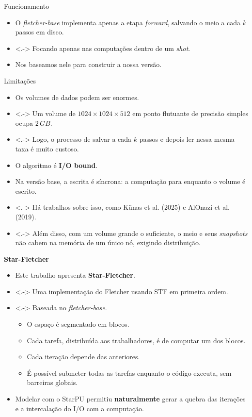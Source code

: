 \documentclass{beamer}
\newcommand{\starflet}{\textbf{Star-Fletcher}}
\begin{document}
\begin{frame}{Funcionamento}
  \begin{itemize}
  \item<+-> O \textit{fletcher-base} implementa apenas a etapa \textit{forward}, salvando o meio a cada $k$ passos em disco.
  \item<.-> Focando apenas nas computações dentro de um \textit{shot}.
  \item<+-> Nos baseamos nele para construir a nossa versão.
  \end{itemize}
\end{frame}

\begin{frame}{Limitações}
  \begin{itemize}
  \item<+-> Os volumes de dados podem ser enormes.
  \item<.-> Um volume de $1024 \times 1024 \times 512$ em ponto flutuante de precisão simples ocupa $2\,GB$.
  \item<.-> Logo, o processo de salvar a cada $k$ passos e depois ler nessa mesma taxa é muito custoso.
  \item<+-> O algoritmo é \textbf{I/O bound}.
  \item<+-> Na versão base, a escrita é síncrona: a computação para enquanto o volume é escrito.
  \item<.-> Há trabalhos sobre isso, como Künas et al. (2025) e AlOnazi et al. (2019).
  \item<.-> Além disso, com um volume grande o suficiente, o meio e seus \textit{snapshots} não cabem na memória de um único nó, exigindo distribuição.
  \end{itemize}
\end{frame}


\begin{frame}{\starflet}
  \begin{itemize}
  \item<+-> Este trabalho apresenta \starflet.
  \item<.-> Uma implementação do Fletcher usando STF em primeira ordem.
  \item<.-> Baseada no \textit{fletcher-base}.
    \begin{itemize}
    \item<+-> O espaço é segmentado em blocos.
    \item<+-> Cada tarefa, distribuída aos trabalhadores, é de computar um dos blocos.
    \item<+-> Cada iteração depende das anteriores.
    \item<+-> É possível submeter todas as tarefas enquanto o código executa, sem barreiras globais.
    \end{itemize}
  \item<+-> Modelar com o StarPU permitiu \textbf{naturalmente} gerar a quebra das iterações e a intercalação do I/O com a computação.
  \end{itemize}
\end{frame}
\end{document}
